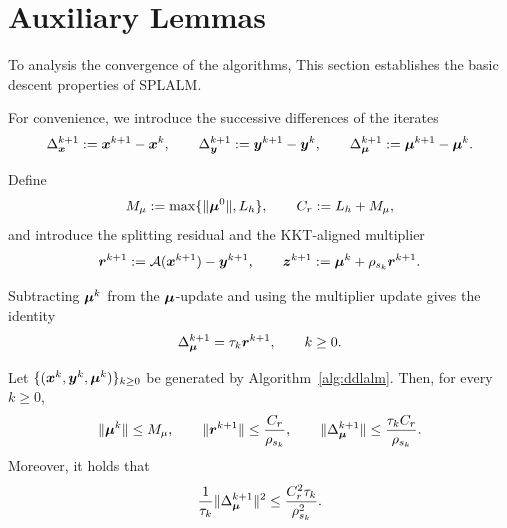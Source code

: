 \iffalse
\section{Auxiliary Lemmas}
\label{sec:basic-descent}
To analysis the convergence of the algorithms, 
This section establishes the basic descent properties of SPLALM.

For convenience, we introduce the successive differences of the iterates
\[
    \Delta_{\bm{x}}^{k+1}:=\bm{x}^{k+1}-\bm{x}^k,
    \qquad
    \Delta_{\bm{y}}^{k+1}:=\bm{y}^{k+1}-\bm{y}^k,
    \qquad
    \Delta_{\bm{\mu}}^{k+1}:=\bm{\mu}^{k+1}-\bm{\mu}^k.
\]

Define
\[
    M_\mu:=\max\{\|\bm{\mu}^0\|,L_h\},
    \qquad
    C_r:=L_h+M_\mu,
\]
and introduce the splitting residual and the KKT-aligned multiplier
\[
\bm{r}^{k+1}:=\mathcal{A}(\bm{x}^{k+1})-\bm{y}^{k+1},
    \qquad
    \bm{z}^{k+1}:=\bm{\mu}^k+\rho_{s_k}\bm{r}^{k+1}.
\]

Subtracting $\bm{\mu}^k$ from the $\bm{\mu}$-update and using the multiplier update
gives the identity
\begin{equation}
    \Delta_{\bm{\mu}}^{k+1}
    =
    \tau_k\bm{r}^{k+1},
    \qquad k\ge0.
    \label{eq:mu-drift-tau}
\end{equation}

\begin{lemma}
\label{lem:multiplier-boundedness}
Let $\{(\bm{x}^k,\bm{y}^k,\bm{\mu}^k)\}_{k\ge0}$ be generated by
Algorithm~\ref{alg:ddlalm}.  Then, for
every $k\ge0$,
\begin{equation}
    \|\bm{\mu}^k\|\le M_\mu,
    \qquad
    \|\bm{r}^{k+1}\|
    \le
    \frac{C_r}{\rho_{s_k}},
    \qquad
    \|\Delta_{\bm{\mu}}^{k+1}\|
    \le
    \frac{\tau_k C_r}{\rho_{s_k}}.
    \label{eq:basic-bounds}
\end{equation}
Moreover, it holds that 
\begin{equation}
    \frac{1}{\tau_k}\|\Delta_{\bm{\mu}}^{k+1}\|^2
    \le\frac{C_r^2\tau_k}{\rho_{s_k}^2}.
    \label{eq:dual-ascent-control}
\end{equation}
\end{lemma}

